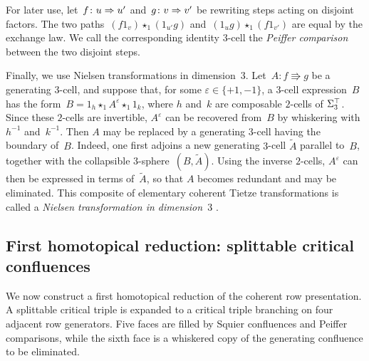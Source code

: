 \documentclass[a4paper, twoside, 11pt, english]{article}
\begin{document}
For later use, let~$f\colon u\Rightarrow u'$ and~$g\colon v\Rightarrow v'$ be
rewriting steps acting on disjoint factors. The two paths~$
(f1_v)\star_1(1_{u'}g)$ and~$
(1_ug)\star_1(f1_{v'})$ are equal by the exchange law. We call the corresponding identity
$3$-cell the \emph{Peiffer comparison} between the two disjoint steps.

Finally, we use Nielsen transformations in dimension~$3$. Let~$A\colon f\Rrightarrow g$
be a generating $3$-cell, and suppose that, for some
$\varepsilon\in\{+1,-1\}$, a $3$-cell expression~$B$ has the form~$B
=
1_h\star_1A^\varepsilon\star_1 1_k$,
where $h$ and~$k$ are composable $2$-cells of $\Sigma^{\top}_3$.
Since these $2$-cells are invertible, $A^\varepsilon$ can be recovered
from~$B$ by whiskering with $h^{-1}$ and~$k^{-1}$. Then $A$ may be
replaced by a generating $3$-cell having the boundary of~$B$.
Indeed, one first adjoins a new generating $3$-cell
$\widetilde A$ parallel to~$B$, together with the collapsible
$3$-sphere~$(B,\widetilde A)$.
Using the inverse $2$-cells, $A^\varepsilon$ can then be expressed in
terms of~$\widetilde A$, so that $A$ becomes redundant and may be
eliminated. This composite of elementary coherent Tietze
transformations is called a
\emph{Nielsen transformation in dimension~$3$}
\cite[Section~2.1.4]{GaussentGuiraudMalbos15}.


\subsection{First homotopical reduction: splittable critical confluences}
\label{SS:FirstReductionSplittable}

We now construct a first homotopical reduction of the coherent row
presentation.  A splittable critical triple is
expanded to a critical triple branching on four adjacent row generators.
Five faces are filled by Squier confluences and Peiffer comparisons, while
the sixth face is a whiskered copy of the generating confluence to be
eliminated.
\end{document}
